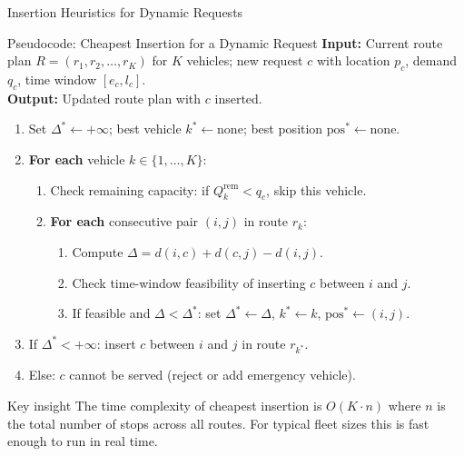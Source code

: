 \documentclass[aspectratio=169,10pt]{beamer}
\begin{document}
\begin{frame}[allowframebreaks]{Insertion Heuristics for Dynamic Requests}
  \framebreak

  \begin{block}{Pseudocode: Cheapest Insertion for a Dynamic Request}
    \textbf{Input:} Current route plan $R = (r_1, r_2, \ldots, r_K)$ for $K$ vehicles;
    new request $c$ with location $p_c$, demand $q_c$, time window $[e_c, l_c]$.\\
    \textbf{Output:} Updated route plan with $c$ inserted.

    \medskip
    \begin{enumerate}
      \item Set $\Delta^* \leftarrow +\infty$; best vehicle $k^* \leftarrow \text{none}$;
            best position $\text{pos}^* \leftarrow \text{none}$.
      \item \textbf{For each} vehicle $k \in \{1, \ldots, K\}$:
        \begin{enumerate}
          \item Check remaining capacity: if $Q_k^{\mathrm{rem}} < q_c$, skip this vehicle.
          \item \textbf{For each} consecutive pair $(i, j)$ in route $r_k$:
            \begin{enumerate}
              \item Compute $\Delta = d(i, c) + d(c, j) - d(i, j)$.
              \item Check time-window feasibility of inserting $c$ between $i$ and $j$.
              \item If feasible and $\Delta < \Delta^*$: set $\Delta^* \leftarrow \Delta$,
                    $k^* \leftarrow k$, $\text{pos}^* \leftarrow (i, j)$.
            \end{enumerate}
        \end{enumerate}
      \item If $\Delta^* < +\infty$: insert $c$ between $i$ and $j$ in route $r_{k^*}$.
      \item Else: $c$ cannot be served (reject or add emergency vehicle).
    \end{enumerate}
  \end{block}

  \begin{alertblock}{Key insight}
    The time complexity of cheapest insertion is $O(K \cdot n)$ where $n$ is
    the total number of stops across all routes.  For typical fleet sizes this
    is fast enough to run in real time.
  \end{alertblock}

\end{frame}
\end{document}
